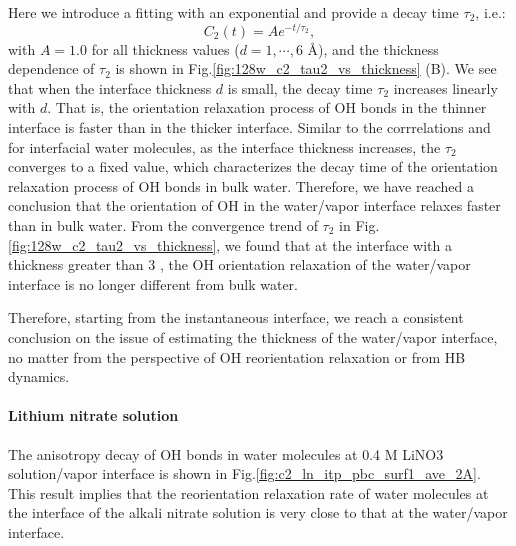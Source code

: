 Here we introduce a fitting with an exponential and provide a decay time $\tau_2$, i.e.: 
\begin{equation}
C_2(t)=Ae^{-t/\tau_2},
\label{eq:c2_single_exponential}
\end{equation}
with $A= 1.0$ for all thickness values ($d=1,\cdots, 6$ \AA), and the thickness dependence of $\tau_2$ is shown in Fig.\thinspace\ref{fig:128w_c2_tau2_vs_thickness} (B).
We see that when the interface thickness $d$ is small, the decay time $\tau_2$ increases linearly with $d$. 
That is, the orientation relaxation process of OH bonds in the thinner interface is faster than in the thicker interface.
Similar to the corrrelations \CHB and \SHB for interfacial water molecules, as the interface thickness increases, the $\tau_2$ converges to a fixed value,
which characterizes the decay time of the orientation relaxation process of OH bonds in bulk water. 
Therefore, we have reached a conclusion that the orientation of OH in the water/vapor interface relaxes faster than in bulk water. 
From the convergence trend of $\tau_2$ in Fig.\thinspace\ref{fig:128w_c2_tau2_vs_thickness}, 
we found that at the interface with a thickness greater than 3 \A, the OH orientation relaxation of the water/vapor interface is no longer different from bulk water. 

Therefore, starting from the instantaneous interface, we reach a consistent conclusion on the issue of estimating the thickness of the water/vapor interface, 
no matter from the perspective of OH reorientation relaxation or from HB dynamics.

\paragraph{Lithium nitrate solution}
The anisotropy decay of OH bonds in water molecules at 0.4 M LiNO3 solution/vapor interface is shown in Fig.\thinspace\ref{fig:c2_ln_itp_pbc_surf1_ave_2A}.  
This result implies that the reorientation relaxation rate of water molecules at the interface of the alkali nitrate solution 
is very close to that at the water/vapor interface.

